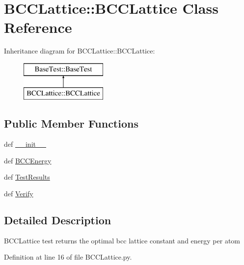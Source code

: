 \hypertarget{classBCCLattice_1_1BCCLattice}{
\section{BCCLattice::BCCLattice Class Reference}
\label{classBCCLattice_1_1BCCLattice}
}
Inheritance diagram for BCCLattice::BCCLattice:\begin{figure}[H]
\begin{center}
\leavevmode
\includegraphics[height=2.000000cm]{classBCCLattice_1_1BCCLattice}
\end{center}
\end{figure}
\subsection*{Public Member Functions}
\begin{DoxyCompactItemize}
\item 
def \hyperlink{classBCCLattice_1_1BCCLattice_a045ea313d64d62d2aa2aabbf80ec0883}{\_\-\_\-init\_\-\_\-}
\item 
def \hyperlink{classBCCLattice_1_1BCCLattice_a73cdd5796914d1f3da10eb894789d6f0}{BCCEnergy}
\item 
def \hyperlink{classBCCLattice_1_1BCCLattice_af91a4c550d37e5c1d954e3add3a04f09}{TestResults}
\item 
def \hyperlink{classBCCLattice_1_1BCCLattice_a8bcd1934ba4c02415e8e0d6264b3e011}{Verify}
\end{DoxyCompactItemize}


\subsection{Detailed Description}
\begin{DoxyVerb}BCCLattice test returns the optimal bcc lattice constant and energy per atom\end{DoxyVerb}
 

Definition at line 16 of file BCCLattice.py.




